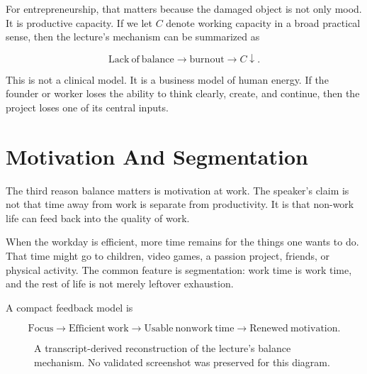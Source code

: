 For entrepreneurship, that matters because the damaged object is not only mood. It is productive capacity. If we let \(C\) denote working capacity in a broad practical sense, then the lecture's mechanism can be summarized as

\begin{equation}
\mathrm{Lack\ of\ balance}
\longrightarrow
\mathrm{burnout}
\longrightarrow
C \downarrow .
\end{equation}

This is not a clinical model. It is a business model of human energy. If the founder or worker loses the ability to think clearly, create, and continue, then the project loses one of its central inputs.

\section{Motivation And Segmentation}

The third reason balance matters is motivation at work. The speaker's claim is not that time away from work is separate from productivity. It is that non-work life can feed back into the quality of work.

When the workday is efficient, more time remains for the things one wants to do. That time might go to children, video games, a passion project, friends, or physical activity. The common feature is segmentation: work time is work time, and the rest of life is not merely leftover exhaustion.

A compact feedback model is

\begin{equation}
\mathrm{Focus}
\longrightarrow
\mathrm{Efficient\ work}
\longrightarrow
\mathrm{Usable\ nonwork\ time}
\longrightarrow
\mathrm{Renewed\ motivation}.
\end{equation}

\begin{figure}
\centering
{}
\caption{A transcript-derived reconstruction of the lecture's balance mechanism. No validated screenshot was preserved for this diagram.}
\end{figure}


